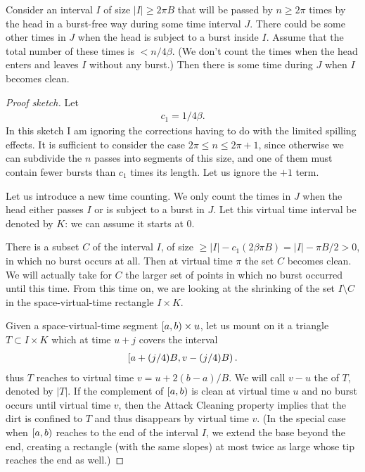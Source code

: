 \documentclass[12pt]{memoir}
\renewcommand{\le}{\leq}
\renewcommand{\ge}{\geq}
\def\B{B}
\begin{document}
\begin{lemma}\label{lem:dirty-passes}
Consider an interval \( I \) of size \( |I|\ge 2\pi B \) 
that will be passed by \( n\ge 2\pi \) times
by the head in a burst-free way during some time interval \( J \).
There could be some other times in \( J \) when the head is subject to a burst inside \( I \).
Assume that the total number of these times is \( < n/4\beta \).
(We don't count the times when the head enters and leaves \( I \) without
any burst.)
Then there is some time during \( J \) when \( I \) becomes clean.
\end{lemma}
\begin{proof}[Proof sketch]
Let 
\begin{align}\label{eq:dirty-passes-const}
 c_{1}=1/4\beta .
\end{align}
In this sketch I am ignoring the corrections having to do with the
limited spilling effects.
It is sufficient to consider the case \( 2\pi \le n\le 2\pi+1 \), since otherwise
we can subdivide the \( n \) passes into segments of this size,
and one of them must contain fewer bursts than \(  c_{1} \) times its length.
Let us ignore the \( +1 \) term.

Let us introduce a new  time counting.
We only count the times in \( J \) when the head either passes \( I \)
or is subject to a burst in \( J \).
Let this virtual time interval be denoted by \( K \): we can assume it starts at 0.

There is a subset \( C \) of the interval \( I \),
of size \( \ge |I|-c_{1}(2\beta\pi B)=|I|-\pi B/2>0 \), in which no burst occurs at all.
Then at virtual time \( \pi \) the set \( C \) becomes clean.
We will actually take for \( C \) the larger set of points in which no burst occurred until
this time.
From this time on, we are looking at the shrinking of the set \( I\setminus C \)
in the space-virtual-time rectangle \( I\times K \).

Given a space-virtual-time segment \( \left[a,b\right)\times u \),
let us mount on it a triangle \( T\subset I\times K \)
which at time \( u+j \) covers the interval
 \begin{align*}
 \lint{a+(j/4)\B}{v-(j/4)\B}.
 \end{align*}
thus \( T \) reaches to virtual time \( v=u+2(b-a)/\B \).
We will call \( v-u \) the  of \( T \), denoted by \( |T| \).
If the complement of \( \left[a,b\right) \) is clean at virtual time \( u \)
and no burst occurs until virtual time 
\( v \), then the Attack Cleaning property implies that the dirt
is confined to \( T \) and thus disappears by virtual time \( v \).
(In the special case when \( \left[a,b\right) \) reaches to the end of the interval \( I \),
we extend the base beyond the end, creating a rectangle (with the same slopes)
at most twice as large whose tip reaches the end as well.)


\end{proof}
\end{document}
